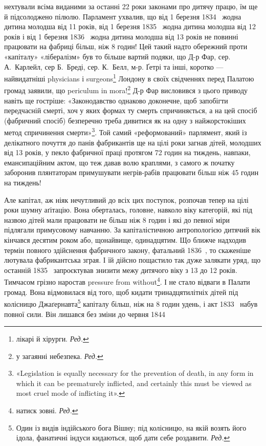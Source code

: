 \parcont{}  %
нехтували всіма виданими за останні 22 роки законами про дитячу
працю, їм ще й підсолоджено пілюлю. Парламент ухвалив, що
від 1 березня 1834~ жодна дитина молодша від 11 років, від
1 березня 1835~ жодна дитина молодша від 12 років і від 1 березня
1836~ жодна дитина молодша від 13 років не повинні
працювати на фабриці більш, ніж 8 годин! Цей такий надто обережний
проти «капіталу» «лібералізм» був то більше вартий
подяки, що Д-р Фар, сер. А.~Карлейл, сер Б.~Бреді, сер. К.~Белл,
м-р. Ґетрі та інші, коротко — найвидатніші physicians і surgeons\footnote*{
лікарі й хірурги. \emph{Ред.}
} Лондону в своїх свідченнях перед Палатою громад заявили, що
periculum in mora!\footnote*{
у загаянні небезпека. \emph{Ред.}
} Д-р Фар висловився з цього приводу навіть
ще гостріше: «Законодавство однаково доконечне, щоб запобігти
передчасній смерті, хоч у яких формах ту смерть спричиняється,
а на цей спосіб (фабричний спосіб) безперечно треба дивитися
як на одну з найжорстокіших метод спричинення смерти»\footnote{
«Legislation is equally necessary for the prevention of death, in
any form in which it can be prematurely inflicted, and certainly this must
be viewed as most cruel mode of inflicting it».
}.
Той самий «реформований» парлямент, який із делікатного почуття
до панів фабрикантів ще на цілі роки загнав дітей, молодших
від 13 років, у пекло фабричної праці протягом 72 годин на
тиждень, навпаки, емансипаційним актом, що теж давав волю
краплями, з самого ж початку заборонив плянтаторам примушувати
негрів-рабів працювати більш ніж 45 годин на тиждень!

Але капітал, аж ніяк нечутливий до всіх цих поступок, розпочав
тепер на цілі роки шумну аґітацію. Вона оберталась, головне,
навколо віку категорій, які під назвою дітей мали працювати
не більш ніж 8 годин і які до певної міри підлягали примусовому
навчанню. За капіталістичною антропологією дитячий
вік кінчався десятим роком або, щонайвище, одинадцятим. Що
ближче надходив термін повного здійснення фабричного закону,
фатальний 1836~, то скаженіше лютувала фабрикантська зграя.
І їй дійсно пощастило так дуже залякати уряд, що останній
1835~ запроєктував знизити межу дитячого віку з 13 до 12 років.
Тимчасом грізно наростав pressure from without\footnote*{
натиск зовні. \emph{Ред.}
}. І не стало відваги
в Палати громад. Вона відмовилася від того, щоб кидати
тринадцятилітніх дітей під колісницю Джаґернавта\footnote*{
Один із видів індійського бога Вішну; під колісницю, на якій возять
його ідола, фанатичні індуси кидаються, щоб дати себе роздавити. \emph{Ред.}
} капіталу
більш, ніж на 8 годин удень, і акт 1833~ набув повної сили.
Він лишався без зміни до червня 1844~


